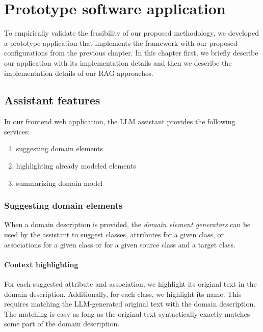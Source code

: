 \chapter{Prototype software application}
\label{chap:protype_software_application}

To empirically validate the feasibility of our proposed methodology, we developed a prototype application that implements the framework with our proposed configurations from the previous chapter. In this chapter first, we briefly describe our application with its implementation details and then we describe the implementation details of our RAG approaches.


\section{Assistant features}

In our frontend web application, the LLM assistant provides the following services:

\begin{enumerate}
\item suggesting domain elements
\item highlighting already modeled elements
\item summarizing domain model
\end{enumerate}


\subsection{Suggesting domain elements}

When a domain description is provided, the \emph{domain element generators} can be used by the assistant to suggest classes, attributes for a given class, or associations for a given class or for a given source class and a target class. 


\subsubsection{Context highlighting}
\label{sec:context_highlighting}

For each suggested attribute and association, we highlight its original text in the domain description. Additionally, for each class, we highlight its name. This requires matching the LLM-generated original text with the domain description. The matching is easy as long as the original text syntactically exactly matches some part of the domain description.

